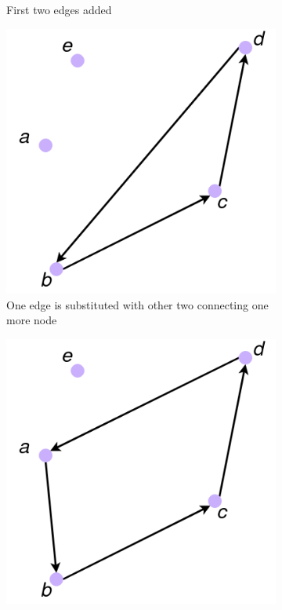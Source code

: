 \begin{figure}
\begin{subfigure}[b]{0.3\textwidth}
		\caption{First two edges added}
	\end{subfigure}
	\hfill
	\begin{subfigure}[b]{0.3\textwidth}
		\includegraphics[width=\textwidth]{images/extra_3}
		\caption{One edge is substituted with other two connecting one more node}
	\end{subfigure}
	\bigskip
	\begin{subfigure}{0.3\textwidth}
		\centering
		\includegraphics[width=\textwidth]{images/extra_4}

\end{subfigure}
\end{figure}
